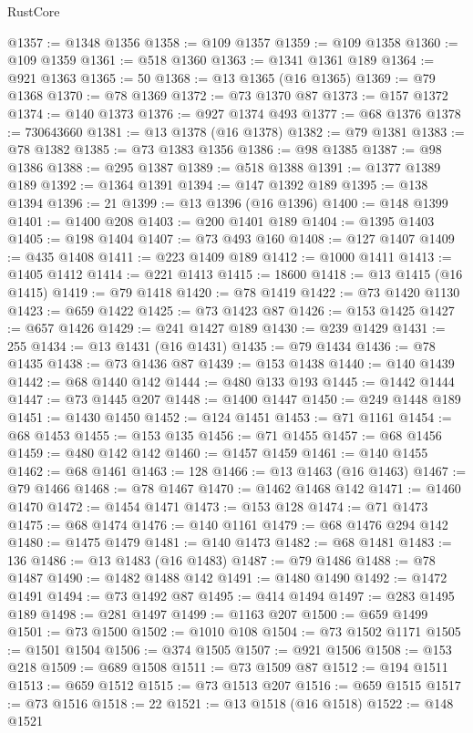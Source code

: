 \begin{lexlean}{RustCore}
\begin{coremodule}
@1357 := @1348 @1356
@1358 := @109 @1357
@1359 := @109 @1358
@1360 := @109 @1359
@1361 := @518 @1360
@1363 := @1341 @1361 @189
@1364 := @921 @1363
@1365 := 50
@1368 := @13 @1365 (@16 @1365)
@1369 := @79 @1368
@1370 := @78 @1369
@1372 := @73 @1370 @87
@1373 := @157 @1372
@1374 := @140 @1373
@1376 := @927 @1374 @493
@1377 := @68 @1376
@1378 := 730643660
@1381 := @13 @1378 (@16 @1378)
@1382 := @79 @1381
@1383 := @78 @1382
@1385 := @73 @1383 @1356
@1386 := @98 @1385
@1387 := @98 @1386
@1388 := @295 @1387
@1389 := @518 @1388
@1391 := @1377 @1389 @189
@1392 := @1364 @1391
@1394 := @147 @1392 @189
@1395 := @138 @1394
@1396 := 21
@1399 := @13 @1396 (@16 @1396)
@1400 := @148 @1399
@1401 := @1400 @208
@1403 := @200 @1401 @189
@1404 := @1395 @1403
@1405 := @198 @1404
@1407 := @73 @493 @160
@1408 := @127 @1407
@1409 := @435 @1408
@1411 := @223 @1409 @189
@1412 := @1000 @1411
@1413 := @1405 @1412
@1414 := @221 @1413
@1415 := 18600
@1418 := @13 @1415 (@16 @1415)
@1419 := @79 @1418
@1420 := @78 @1419
@1422 := @73 @1420 @1130
@1423 := @659 @1422
@1425 := @73 @1423 @87
@1426 := @153 @1425
@1427 := @657 @1426
@1429 := @241 @1427 @189
@1430 := @239 @1429
@1431 := 255
@1434 := @13 @1431 (@16 @1431)
@1435 := @79 @1434
@1436 := @78 @1435
@1438 := @73 @1436 @87
@1439 := @153 @1438
@1440 := @140 @1439
@1442 := @68 @1440 @142
@1444 := @480 @133 @193
@1445 := @1442 @1444
@1447 := @73 @1445 @207
@1448 := @1400 @1447
@1450 := @249 @1448 @189
@1451 := @1430 @1450
@1452 := @124 @1451
@1453 := @71 @1161
@1454 := @68 @1453
@1455 := @153 @135
@1456 := @71 @1455
@1457 := @68 @1456
@1459 := @480 @142 @142
@1460 := @1457 @1459
@1461 := @140 @1455
@1462 := @68 @1461
@1463 := 128
@1466 := @13 @1463 (@16 @1463)
@1467 := @79 @1466
@1468 := @78 @1467
@1470 := @1462 @1468 @142
@1471 := @1460 @1470
@1472 := @1454 @1471
@1473 := @153 @128
@1474 := @71 @1473
@1475 := @68 @1474
@1476 := @140 @1161
@1479 := @68 @1476 @294 @142
@1480 := @1475 @1479
@1481 := @140 @1473
@1482 := @68 @1481
@1483 := 136
@1486 := @13 @1483 (@16 @1483)
@1487 := @79 @1486
@1488 := @78 @1487
@1490 := @1482 @1488 @142
@1491 := @1480 @1490
@1492 := @1472 @1491
@1494 := @73 @1492 @87
@1495 := @414 @1494
@1497 := @283 @1495 @189
@1498 := @281 @1497
@1499 := @1163 @207
@1500 := @659 @1499
@1501 := @73 @1500
@1502 := @1010 @108
@1504 := @73 @1502 @1171
@1505 := @1501 @1504
@1506 := @374 @1505
@1507 := @921 @1506
@1508 := @153 @218
@1509 := @689 @1508
@1511 := @73 @1509 @87
@1512 := @194 @1511
@1513 := @659 @1512
@1515 := @73 @1513 @207
@1516 := @659 @1515
@1517 := @73 @1516
@1518 := 22
@1521 := @13 @1518 (@16 @1518)
@1522 := @148 @1521

\end{coremodule}
\end{lexlean}
